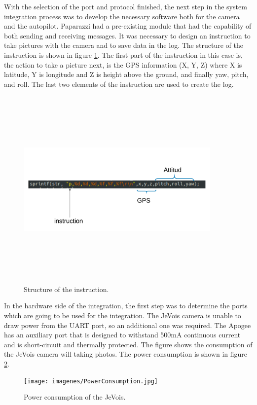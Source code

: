 With the selection of the port and protocol finished, the next step in the system integration process was to develop the necessary software both for the camera and the autopilot. Paparazzi had a pre-existing module that had the capability of both sending and receiving messages. It was necessary to design an instruction to take pictures with the camera and to save data in the log. The structure of the instruction is shown in figure \ref{fig:instruction}. The first part of the instruction in this case is, the action to take a picture next, is the GPS information (X, Y, Z) where X is latitude, Y is longitude and Z is height above the ground, and finally yaw, pitch, and roll. The last two elements of the instruction are used to create the log.
\begin{figure}[H]
\centering
\includegraphics[width=10cm,height=10cm,keepaspectratio]{imagenes/Instruction.png}
\caption{Structure of the instruction.}
\label{fig:instruction}
\end{figure}
In the hardware side of the integration, the first step was to determine the ports which are going to be used  for the integration. The JeVois camera is unable to draw power from the UART port, so an additional one was required. The Apogee has an auxiliary port that is designed to withstand 500mA continuous current and is short-circuit and thermally protected. The figure shows the consumption of the JeVois camera will taking photos. The power consumption is shown in figure \ref{fig:poweer}.
\begin{figure}[H]
\centering
\texttt{[image: imagenes/PowerConsumption.jpg]}
\caption{Power consumption of the JeVois.}
\label{fig:poweer}
\end{figure}

